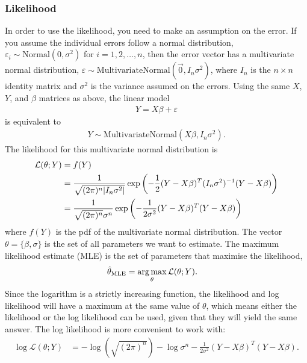 \documentclass[a4paper]{article}
\begin{document}
\subsubsection{Likelihood}
In order to use the likelihood, you need to make an assumption on the error.
If you assume the individual errors follow a normal distribution,
$\varepsilon_i \sim \text{Normal}(0, \sigma^2)$ for $ i = 1 ,2 , \ldots , n $,
then the error vector has a multivariate normal distribution, $\varepsilon \sim \text{MultivariateNormal}(\vec{0}, I_n \sigma^2)$,
where $I_n$ is the $n \times n$ identity matrix and $\sigma^2$ is the variance assumed on the errors. Using the same $X$, $Y$, and $\beta$ matrices as above, the linear model
\begin{align*}
  Y = X \beta + \varepsilon
\end{align*}
is equivalent to
\begin{align*}
  Y \sim \text{MultivariateNormal}(X \beta, I_n \sigma^2 )
  \text{.}
\end{align*}
The likelihood for this multivariate normal distribution is
\begin{align*}
\mathcal{L}(\theta;Y) &= f(Y) \\
&=
\frac{1}{\sqrt{(2\pi)^n \lvert I_n \sigma^2\rvert }}
\exp{
  \left(
  -\frac{1}{2}
   (Y-X\beta)^T  (I_n \sigma^2)^{-1} (Y - X \beta)
  \right)
} \\
&=
\frac{1}{\sqrt{(2\pi)^n  } \sigma^{n}}
\exp{
  \left(
  -\frac{1}{2 \sigma^2}
   (Y-X\beta)^T (Y-X\beta)
  \right)
}
\end{align*}
where $f(Y)$ is the pdf of the multivariate normal distribution.
The vector $\theta = \{ \beta, \sigma \}$ is the set of all parameters we want to estimate.
The maximum likelihood estimate (MLE) is the set of parameters that maximise the likelihood,
\begin{align}
\label{eq:regressiontheory:argmax}
\hat{\theta}_{\text{MLE}}
&=
\operatorname*{arg\,max}_{\theta}
\mathcal{L}(\theta;Y)
\text{.}
\end{align}
Since the logarithm is a strictly increasing function, the likelihood and log likelihood will have a maximum at the same value of $\theta$,
which means either the likelihood or the log likelihood can be used, given that they will yield the same answer.
The log likelihood is more convenient to work with:
\begin{align*}
\log\mathcal{L}(\theta;Y)
&=
-\log\left(\sqrt{(2\pi)^n} \right)
-\log\sigma^{n}
  -\frac{1}{2 \sigma^2}
   (Y-X\beta)^T (Y-X\beta)
   \text{.}
\end{align*}
\end{document}
